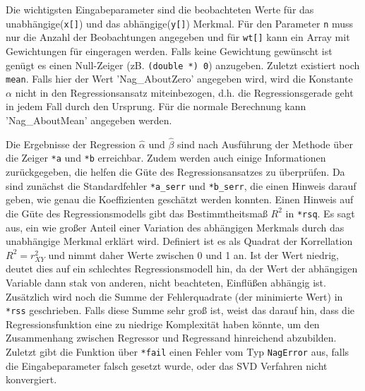 Die wichtigsten Eingabeparameter sind die beobachteten Werte für das unabhängige(\lstinline{x[]}) und das abhängige(\lstinline{y[]}) Merkmal.
Für den Parameter \lstinline{n} muss nur die Anzahl der Beobachtungen angegeben und für \lstinline{wt[]} kann ein Array mit Gewichtungen für eingeragen werden.   
Falls keine Gewichtung gewünscht ist genügt es einen Null-Zeiger (zB. \lstinline{(double *) 0}) anzugeben.
Zuletzt existiert noch \lstinline{mean}.
Falls hier der Wert 'Nag\_AboutZero' angegeben wird, wird die Konstante $\alpha$ nicht in den Regressionsansatz miteinbezogen, d.h. die Regressionsgerade geht in jedem Fall durch den Ursprung.
Für die normale Berechnung kann 'Nag\_AboutMean' angegeben werden.

Die Ergebnisse der Regression $\hat\alpha$ und $\hat\beta$ sind nach Ausführung der Methode über die Zeiger \lstinline{*a} und \lstinline{*b} erreichbar.
Zudem werden auch einige Informationen zurückgegeben, die helfen die Güte des Regressionsansatzes zu überprüfen.
Da sind zunächst die Standardfehler \lstinline{*a_serr} und \lstinline{*b_serr}, die einen Hinweis darauf geben, wie genau die Koeffizienten geschätzt werden konnten.
Einen Hinweis auf die Güte des Regressionsmodells gibt das Bestimmtheitsmaß $R^2$ in \lstinline{*rsq}.
Es sagt aus, ein wie großer Anteil einer Variation des abhängigen Merkmals durch das unabhängige Merkmal erklärt wird.
Definiert ist es als Quadrat der Korrellation $R^2 = r_{XY}^2$ und nimmt daher Werte zwischen 0 und 1 an.
Ist der Wert niedrig, deutet dies auf ein schlechtes Regressionsmodell hin, da der Wert der abhängigen Variable dann stak von anderen, nicht beachteten, Einflüßen abhängig ist.
Zusätzlich wird noch die Summe der Fehlerquadrate (der minimierte Wert) in \lstinline{*rss} geschrieben.
Falls diese Summe sehr groß ist, weist das darauf hin, dass die Regressionsfunktion eine zu niedrige Komplexität haben könnte, um den Zusammenhang zwischen Regressor und Regressand hinreichend abzubilden.
Zuletzt gibt die Funktion über \lstinline{*fail} einen Fehler vom Typ \lstinline{NagError} aus, falls die Eingabeparameter falsch gesetzt wurde, oder das SVD Verfahren nicht konvergiert.


